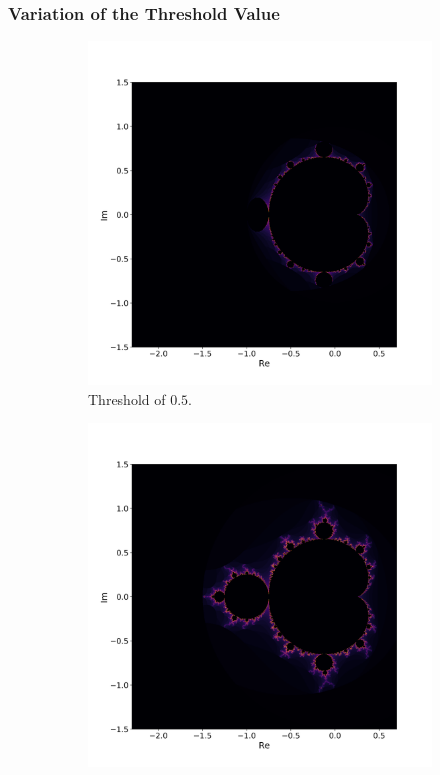 \documentclass[
  12pt,					%
  a4paper,				%
  twoside,				%
]{report}
\begin{document}
\newpage
\subsubsection{Variation of the Threshold Value}

\begin{figure}[H]
\centering
\begin{subfigure}{.45\textwidth}
  \centering
  \includegraphics[width=\linewidth]{IMG/Thresh05.png}
  \caption{Threshold of $0.5$.}
\end{subfigure}%
\begin{subfigure}{.45\textwidth}
  \centering
  \includegraphics[width=\linewidth]{IMG/Thresh1.png}

\end{subfigure}
\end{figure}
\end{document}
